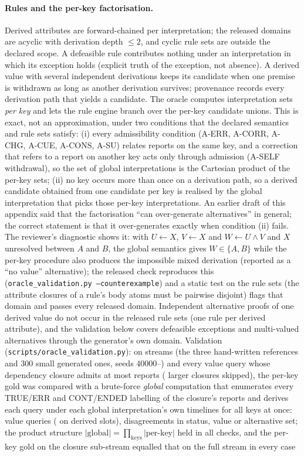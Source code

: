 \paragraph{Rules and the per-key factorisation.} Derived attributes are forward-chained per interpretation; the released domains are acyclic with derivation depth $\le2$, and cyclic rule sets are outside the declared scope. A defeasible rule contributes nothing under an interpretation in which its exception holds (explicit truth of the exception, not absence). A derived value with several independent derivations keeps its candidate when one premise is withdrawn as long as another derivation survives; provenance records every derivation path that yields a candidate. The oracle computes interpretation sets \emph{per key} and lets the rule engine branch over the per-key candidate unions. This is exact, not an approximation, under two conditions that the declared semantics and rule sets satisfy: (i) every admissibility condition (A-ERR, A-CORR, A-CHG, A-CUE, A-CONS, A-SU) relates reports on the same key, and a correction that refers to a report on another key acts only through admission (A-SELF withdrawal), so the set of global interpretations is the Cartesian product of the per-key sets; (ii) no key occurs more than once on a derivation path, so a derived candidate obtained from one candidate per key is realised by the global interpretation that picks those per-key interpretations. An earlier draft of this appendix said that the factorisation ``can over-generate alternatives'' in general; the correct statement is that it over-generates exactly when condition (ii) fails. The reviewer's diagnostic shows it: with $U\leftarrow X$, $V\leftarrow X$ and $W\leftarrow U\wedge V$ and $X$ unresolved between $A$ and $B$, the global semantics gives $W\in\{A,B\}$ while the per-key procedure also produces the impossible mixed derivation (reported as a ``no value'' alternative); the released check reproduces this (\texttt{oracle\_validation.py --counterexample}) and a static test on the rule sets (the attribute closures of a rule's body atoms must be pairwise disjoint) flags that domain and passes every released domain. Independent alternative proofs of one derived value do not occur in the released rule sets (one rule per derived attribute), and the validation below covers defeasible exceptions and multi-valued alternatives through the generator's own domain. Validation (\texttt{scripts/oracle\_validation.py}): on \ovStreams{} streams (the three hand-written references and 300 small generated ones, seeds 40000--) and every value query whose dependency closure admits at most \ovMaxEnum{} reports (\ovSkipped{} larger closures skipped), the per-key gold was compared with a brute-force \emph{global} computation that enumerates every TRUE/ERR and CONT/ENDED labelling of the closure's reports and derives each query under each global interpretation's own timelines for all keys at once: \ovQueries{} value queries (\ovDerived{} on derived slots), \ovDisagree{} disagreements in status, value or alternative set; the product structure $|\text{global}|=\prod_{\text{keys}}|\text{per-key}|$ held in all \ovQueries{} checks, and the per-key gold on the closure sub-stream equalled that on the full stream in every case 